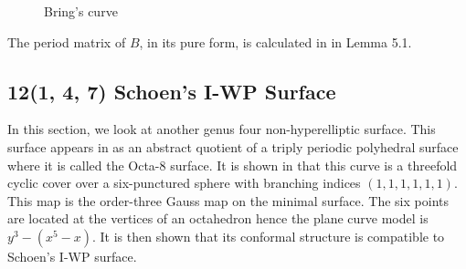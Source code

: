 \documentclass[12pt,reqno]{amsart}
\theoremstyle{definition}
\theoremstyle{remark}
\begin{document}
\begin{figure}[htbp]
    \centering
    \qquad
   \qquad
    \caption{Bring's curve}%
    \label{fig:1331}%
\end{figure}



The period matrix of $B$, in its pure form, is calculated in \cite{matti} in Lemma 5.1. %


\subsection{12(1, 4, 7) Schoen's I-WP Surface}


In this section, we look at another genus four non-hyperelliptic surface. This surface appears in \cite{dthesis} as an abstract quotient of a triply periodic polyhedral surface where it is called the Octa-8 surface. It is shown in \cite{dthesis} that this curve is a threefold cyclic cover over a six-punctured sphere with branching indices $(1, 1, 1, 1, 1, 1).$ This map is the order-three Gauss map on the minimal surface. The six points are located at the vertices of an octahedron hence the plane curve model is $y^3 - (x^5 - x).$ It is then shown that its conformal structure is compatible to Schoen's I-WP surface.
\end{document}
